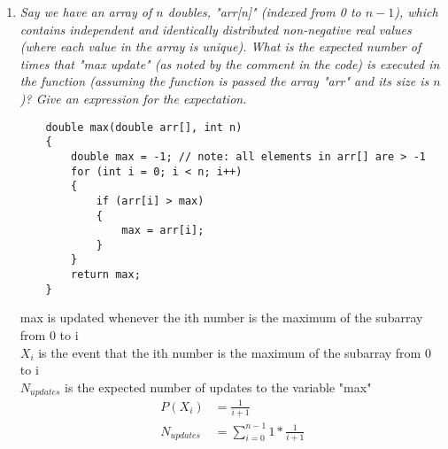 \documentclass{article} %
\begin{document}
\begin{enumerate}
\begin{enumerate}
	\end{enumerate}
	
	\item \textit{Say we have an array of $n$ doubles, "arr[n]" (indexed from 0 to $n - 1$), which contains independent and identically distributed non-negative real values (where each value in the array is unique). What is the expected number of times that "max update" (as noted by the comment in the code) is executed in the function (assuming the function is passed the array "arr" and its size is $n$)? Give an expression for the expectation.}
	\begin{lstlisting}
	double max(double arr[], int n)
	{
		double max = -1; // note: all elements in arr[] are > -1
		for (int i = 0; i < n; i++)
		{
			if (arr[i] > max)
			{
				max = arr[i];
			}
		}
		return max;
	}
	\end{lstlisting}
	max is updated whenever the ith number is the maximum of the subarray from 0 to i\\
	$X_i$ is the event that the ith number is the maximum of the subarray from 0 to i\\
	$N_{updates}$ is the expected number of updates to the variable "max"
	\begin{align*}
	P(X_i) &= \frac{1}{i + 1}\\
	N_{updates} &= \sum_{i = 0}^{n - 1} 1 * \frac{1}{i + 1} 
	\end{align*}
	

\end{enumerate}
\end{document}
